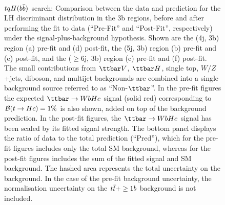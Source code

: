 \begin{figure}[htbp]
\begin{center}
 \\
\caption{\small{$tqH(b\bar{b})$ search: Comparison between the data and prediction for the LH discriminant distribution in the 3b regions,
before and after performing the fit to data  (``Pre-Fit'' and ``Post-Fit'', respectively) under the signal-plus-background hypothesis.
Shown are the (4j, 3b) region (a) pre-fit and (d) post-fit,  the (5j, 3b) region (b) pre-fit and (e) post-fit, and
the ($\geq$6j, 3b) region (c) pre-fit and (f) post-fit.
The small contributions from $\ttbar V$, $\ttbar H$, single top, $W/Z$+jets, diboson, and multijet backgrounds are combined into a single background source 
referred to as ``Non-$\ttbar$''. 
In the pre-fit figures the expected $\Hc$ signal (solid red) corresponding to $\mathcal{B}(t\to Hc)=1\%$ is also shown,
added on top of the background prediction. In the post-fit figures, the $\Hc$ signal has been scaled by its fitted signal strength.
The bottom panel displays the ratio of data to the total prediction (``Pred''), which for the pre-fit figures includes only the total SM background,
whereas for the post-fit figures includes the sum of the fitted signal and SM background.
The hashed area represents the total uncertainty on the background.
In the case of the pre-fit background uncertainty, the normalisation uncertainty on the $t\bar{t}+\geq1b$ background is not included. }}
\label{fig:prepostfit_unblinded_WbHc_3btagex}
\end{center}
\end{figure}


